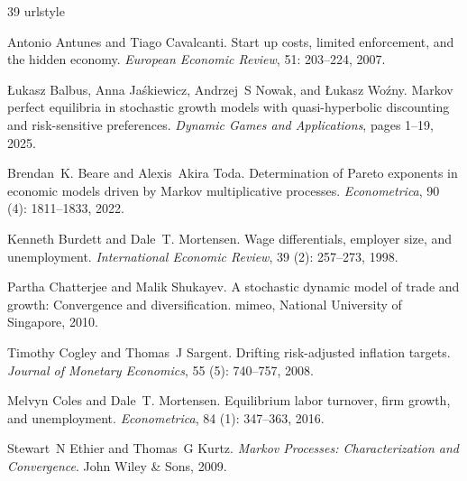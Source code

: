 \documentclass[12pt,reqno]{amsart}
\numberwithin{equation}{section}
\theoremstyle{definition}
\newcommand{\1}{\mathbbm{1}}
\begin{document}
\begin{thebibliography}{39}
\providecommand{\natexlab}[1]{#1}
\providecommand{\url}[1]{\texttt{#1}}
\expandafter\ifx\csname urlstyle\endcsname\relax
  \providecommand{\doi}[1]{doi: #1}\else
  \providecommand{\doi}{doi: \begingroup \urlstyle{rm}\Url}\fi

Antonio Antunes and Tiago Cavalcanti.
\newblock Start up costs, limited enforcement, and the hidden economy.
\newblock \emph{European Economic Review}, 51: 203--224, 2007.

{\L}ukasz Balbus, Anna Ja{\'s}kiewicz, Andrzej~S Nowak, and {\L}ukasz Wo{\'z}ny.
\newblock Markov perfect equilibria in stochastic growth models with quasi-hyperbolic discounting and risk-sensitive preferences.
\newblock \emph{Dynamic Games and Applications}, pages 1--19, 2025.

Brendan~K. Beare and Alexis~Akira Toda.
\newblock Determination of {P}areto exponents in economic models driven by {M}arkov multiplicative processes.
\newblock \emph{Econometrica}, 90 (4): 1811--1833, 2022.

Kenneth Burdett and Dale~T. Mortensen.
\newblock Wage differentials, employer size, and unemployment.
\newblock \emph{International Economic Review}, 39 (2): 257--273, 1998.

Partha Chatterjee and Malik Shukayev.
\newblock A stochastic dynamic model of trade and growth: Convergence and diversification.
\newblock mimeo, National University of Singapore, 2010.

Timothy Cogley and Thomas~J Sargent.
\newblock Drifting risk-adjusted inflation targets.
\newblock \emph{Journal of Monetary Economics}, 55 (5): 740--757, 2008.

Melvyn Coles and Dale~T. Mortensen.
\newblock Equilibrium labor turnover, firm growth, and unemployment.
\newblock \emph{Econometrica}, 84 (1): 347--363, 2016.

Stewart~N Ethier and Thomas~G Kurtz.
\newblock \emph{Markov Processes: Characterization and Convergence}.
\newblock John Wiley \& Sons, 2009.


\end{thebibliography}
\end{document}
